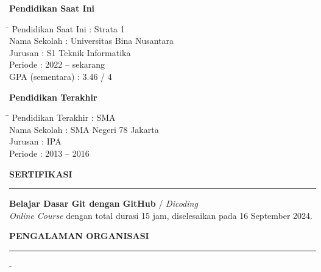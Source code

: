 \documentclass[12pt,a4paper]{article}
\begin{document}
\textbf{Pendidikan Saat Ini}
\begin{tabbing}
\hspace{4cm} \= \hspace{10cm} \kill
Pendidikan Saat Ini \> : Strata 1 \\
Nama Sekolah \> : Universitas Bina Nusantara \\
Jurusan \> : S1 Teknik Informatika \\
Periode \> : 2022 -- sekarang \\
GPA (sementara) \> : 3.46 / 4 \\
\end{tabbing}

\vspace{0.3cm}

\textbf{Pendidikan Terakhir}
\begin{tabbing}
\hspace{4cm} \= \hspace{10cm} \kill
Pendidikan Terakhir \> : SMA \\
Nama Sekolah \> : SMA Negeri 78 Jakarta\\
Jurusan \> : IPA \\
Periode \> : 2013 -- 2016 \\
\end{tabbing}


\vspace{0.5cm}
\textbf{SERTIFIKASI}
\vspace{0.2cm}
\hrule
\vspace{0.4cm}

\textbf{Belajar Dasar Git dengan GitHub} / \textit{Dicoding} \\
\textit{Online Course} dengan total durasi 15 jam, diselesaikan pada 16 September 2024.


\vspace{0.5cm}
\textbf{PENGALAMAN ORGANISASI}
\vspace{0.2cm}
\hrule
\vspace{0.4cm}

-


\end{document}
